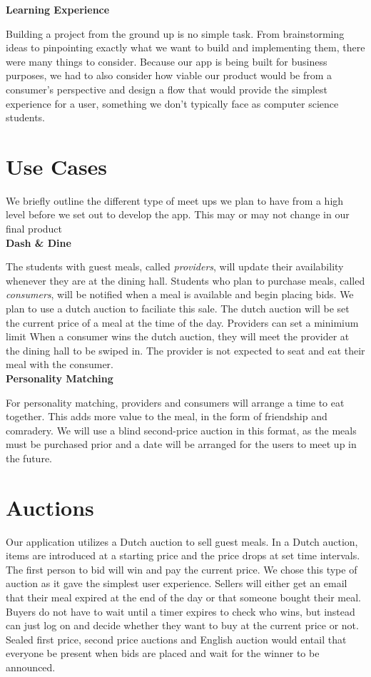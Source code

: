 \documentclass[column,12pt]{article}
\begin{document}
\textbf{Learning Experience}

Building a project from the ground up is no simple task. From brainstorming ideas to pinpointing exactly what we want to build and implementing them, there were many things to consider. Because our app is being built for business purposes, we had to also consider how viable our product would be from a consumer's perspective and design a flow that would provide the simplest experience for a user, something we don't typically face as computer science students. 


\section{Use Cases}
We briefly outline the different type of meet ups we plan to have from a high level before we set out to develop the app. This may or may not change in our final product \\

\textbf{Dash \& Dine}

The students with guest meals, called {\it providers}, will update their availability whenever they are at the dining hall. Students who plan to purchase meals, called {\it consumers}, will be notified when a meal is available and begin placing bids. We plan to use a dutch auction to faciliate this sale. The dutch auction will be set the current price of a meal at the time of the day. Providers can set a minimium limit When a consumer wins the dutch auction,
they will meet the provider at the dining hall to be swiped in. The provider is not expected to seat and eat their meal with the consumer. \\

\textbf{Personality Matching}

For personality matching, providers and consumers will arrange a time to eat together. This adds more value to the meal, in the form of friendship and comradery. We will use a blind second-price auction in this format, as the meals must be purchased prior and a date will be arranged for the users to meet up in the future. 


\section{Auctions}
Our application utilizes a Dutch auction to sell guest meals. In a Dutch auction, items are introduced at a starting price and the price drops at set time intervals. The first person to bid will win and pay the current price. We chose this type of auction as it gave the simplest user experience. Sellers will either get an email that their meal expired at the end of the day or that someone bought their meal. Buyers do not have to wait until a timer expires to check who wins, but instead can just log on and decide whether they want to buy at the current price or not. Sealed first price, second price auctions and English auction would entail that everyone be present when bids are placed and wait for the winner to be announced. 
\end{document}
